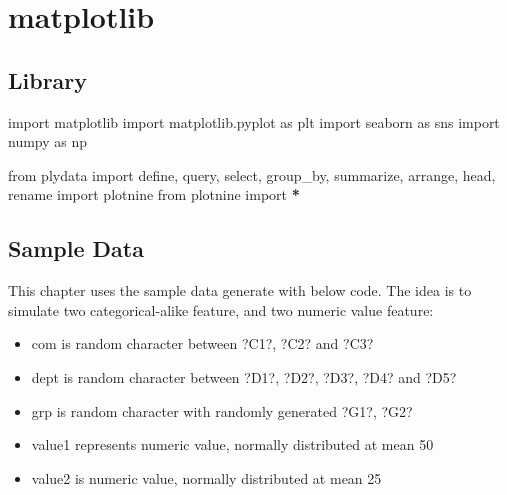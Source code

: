 \documentclass[
]{book}
\newenvironment{Shaded}{\begin{snugshade}}{\end{snugshade}}
\newcommand{\ImportTok}[1]{#1}
\newcommand{\NormalTok}[1]{#1}
\newcommand{\OperatorTok}[1]{\textcolor[rgb]{0.43,0.43,0.43}{\textbf{#1}}}
\providecommand{\tightlist}{%
  \setlength{\itemsep}{0pt}\setlength{\parskip}{0pt}}
\begin{document}
\hypertarget{matplotlib-1}{%
\chapter{matplotlib}\label{matplotlib-1}}

\hypertarget{library}{%
\section{Library}\label{library}}

\begin{Shaded}
\begin{Highlighting}[]
\ImportTok{import}\NormalTok{ matplotlib}
\ImportTok{import}\NormalTok{ matplotlib.pyplot }\ImportTok{as}\NormalTok{ plt}
\ImportTok{import}\NormalTok{ seaborn }\ImportTok{as}\NormalTok{ sns}
\ImportTok{import}\NormalTok{ numpy }\ImportTok{as}\NormalTok{ np}

\ImportTok{from}\NormalTok{ plydata }\ImportTok{import}\NormalTok{ define, query, select, group\_by, summarize, arrange, head, rename}
\ImportTok{import}\NormalTok{ plotnine}
\ImportTok{from}\NormalTok{ plotnine }\ImportTok{import} \OperatorTok{*}
\end{Highlighting}
\end{Shaded}

\hypertarget{sample-data-16}{%
\section{Sample Data}\label{sample-data-16}}

This chapter uses the sample data generate with below code. The idea is to simulate two categorical-alike feature, and two numeric value feature:

\begin{itemize}
\tightlist
\item
  com is random character between ?C1?, ?C2? and ?C3?\\
\item
  dept is random character between ?D1?, ?D2?, ?D3?, ?D4? and ?D5?\\
\item
  grp is random character with randomly generated ?G1?, ?G2?\\
\item
  value1 represents numeric value, normally distributed at mean 50\\
\item
  value2 is numeric value, normally distributed at mean 25
\end{itemize}
\end{document}
